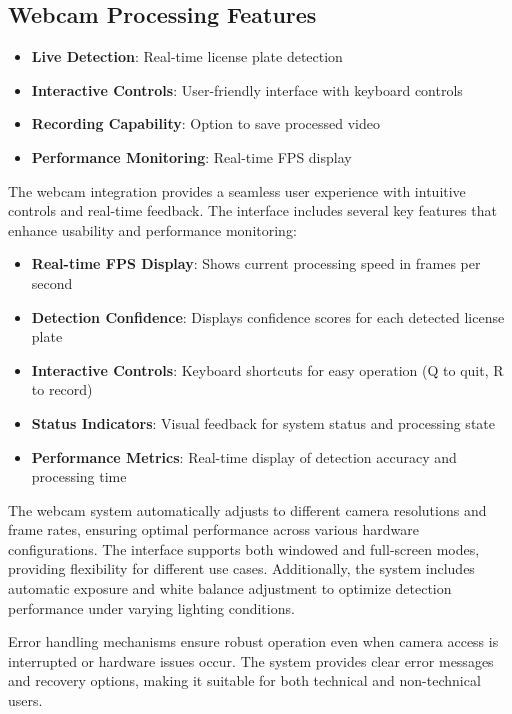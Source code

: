 \documentclass[12pt,a4paper]{article}
\begin{document}
\subsection{Webcam Processing Features}

\begin{itemize}
    \item \textbf{Live Detection}: Real-time license plate detection
    \item \textbf{Interactive Controls}: User-friendly interface with keyboard controls
    \item \textbf{Recording Capability}: Option to save processed video
    \item \textbf{Performance Monitoring}: Real-time FPS display
\end{itemize}

The webcam integration provides a seamless user experience with intuitive controls and real-time feedback. The interface includes several key features that enhance usability and performance monitoring:

\begin{itemize}
    \item \textbf{Real-time FPS Display}: Shows current processing speed in frames per second
    \item \textbf{Detection Confidence}: Displays confidence scores for each detected license plate
    \item \textbf{Interactive Controls}: Keyboard shortcuts for easy operation (Q to quit, R to record)
    \item \textbf{Status Indicators}: Visual feedback for system status and processing state
    \item \textbf{Performance Metrics}: Real-time display of detection accuracy and processing time
\end{itemize}

The webcam system automatically adjusts to different camera resolutions and frame rates, ensuring optimal performance across various hardware configurations. The interface supports both windowed and full-screen modes, providing flexibility for different use cases. Additionally, the system includes automatic exposure and white balance adjustment to optimize detection performance under varying lighting conditions.

Error handling mechanisms ensure robust operation even when camera access is interrupted or hardware issues occur. The system provides clear error messages and recovery options, making it suitable for both technical and non-technical users.
\end{document}
